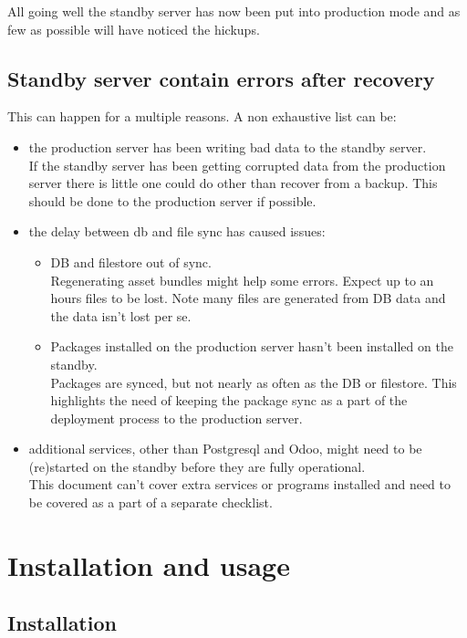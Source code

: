 \documentclass[a4paper]{article}
\begin{document}
	All going well the standby server has now been put into production mode and as few as possible will have noticed the hickups.

\subsection{Standby server contain errors after recovery}
	This can happen for a multiple reasons. A non exhaustive list can be:
	\begin{itemize}
		\item the production server has been writing bad data to the standby server.\\
				If the standby server has been getting corrupted data from the production server there is little one could do other than recover from a backup. This should be done to the production server if possible.
		\item the delay between db and file sync has caused issues:
		\begin{itemize}
			\item DB and filestore out of sync.\\
				Regenerating asset bundles might help some errors. Expect up to an hours files to be lost. Note many files are generated from DB data and the data isn't lost per se.
			\item Packages installed on the production server hasn't been installed on the standby.\\Packages are synced, but not  nearly as often as the DB or filestore. This highlights the need of keeping the package sync as a part of the deployment process to the production server.
		\end{itemize}
		\item additional services, other than Postgresql and Odoo, might need to be (re)started on the standby before they are fully operational.\\
			This document can't cover extra services or programs installed and need to be covered as a part of a separate checklist. 
	\end{itemize}

\section{Installation and usage}
	
\subsection{Installation}
\end{document}
